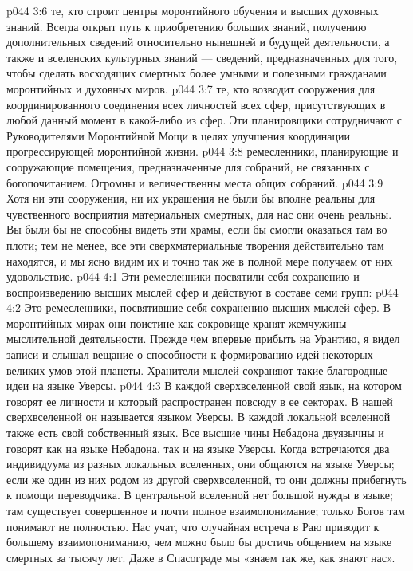 \vs p044 3:6 \pc {}\bibnobreakspace {} те, кто строит центры моронтийного обучения и высших духовных знаний. Всегда открыт путь к приобретению больших знаний, получению дополнительных сведений относительно нынешней и будущей деятельности, а также и вселенских культурных знаний --- сведений, предназначенных для того, чтобы сделать восходящих смертных более умными и полезными гражданами моронтийных и духовных миров.
\vs p044 3:7 \pc {}\bibnobreakspace {} те, кто возводит сооружения для координированного соединения всех личностей всех сфер, присутствующих в любой данный момент в какой\hyp{}либо из сфер. Эти планировщики сотрудничают с Руководителями Моронтийной Мощи в целях улучшения координации прогрессирующей моронтийной жизни.
\vs p044 3:8 \pc {}\bibnobreakspace {} ремесленники, планирующие и сооружающие помещения, предназначенные для собраний, не связанных с богопочитанием. Огромны и величественны места общих собраний.
\vs p044 3:9 Хотя ни эти сооружения, ни их украшения не были бы вполне реальны для чувственного восприятия материальных смертных, для нас они очень реальны. Вы были бы не способны видеть эти храмы, если бы смогли оказаться там во плоти; тем не менее, все эти сверхматериальные творения действительно там находятся, и мы ясно видим их и точно так же в полной мере получаем от них удовольствие.
\vs p044 4:1 Эти ремесленники посвятили себя сохранению и воспроизведению высших мыслей сфер и действуют в составе семи групп:
\vs p044 4:2 \pc {}\bibnobreakspace {} Это ремесленники, посвятившие себя сохранению высших мыслей сфер. В моронтийных мирах они поистине как сокровище хранят жемчужины мыслительной деятельности. Прежде чем впервые прибыть на Урантию, я видел записи и слышал вещание о способности к формированию идей некоторых великих умов этой планеты. Хранители мыслей сохраняют такие благородные идеи на языке Уверсы.
\vs p044 4:3 В каждой сверхвселенной свой язык, на котором говорят ее личности и который распространен повсюду в ее секторах. В нашей сверхвселенной он называется языком Уверсы. В каждой локальной вселенной также есть свой собственный язык. Все высшие чины Небадона двуязычны и говорят как на языке Небадона, так и на языке Уверсы. Когда встречаются два индивидуума из разных локальных вселенных, они общаются на языке Уверсы; если же один из них родом из другой сверхвселенной, то они должны прибегнуть к помощи переводчика. В центральной вселенной нет большой нужды в языке; там существует совершенное и почти полное взаимопонимание; только Богов там понимают не полностью. Нас учат, что случайная встреча в Раю приводит к большему взаимопониманию, чем можно было бы достичь общением на языке смертных за тысячу лет. Даже в Спасограде мы «знаем так же, как знают нас».
